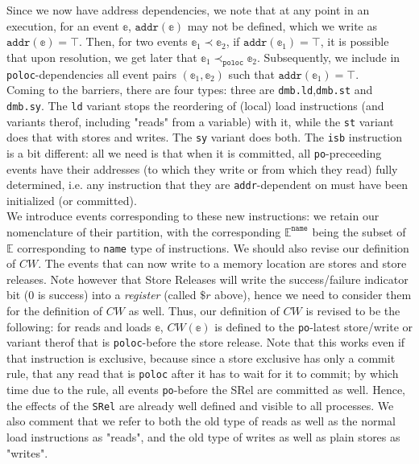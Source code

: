\documentclass{article}
\newcommand{\var}{\texttt}
\begin{document}
Since we now have address dependencies, we note that at any point in an execution, for an event $\mathbb{e}$, $\var{addr}(\mathbb{e})$ may not be defined, which we write as $\var{addr}(\mathbb{e}) = \top$. Then, for two events $\mathbb{e}_1 \prec \mathbb{e}_2$, if $\var{addr}(\mathbb{e}_1) = \top$, it is possible that upon resolution, we get later that $\mathbb{e}_1 \prec_\var{poloc} \mathbb{e}_2$. Subsequently, we include in \var{poloc}-dependencies all event pairs $(\mathbb{e}_1,\mathbb{e}_2)$ such that $\var{addr}(\mathbb{e}_1) = \top$.\\
Coming to the barriers, there are four types: three are \var{dmb.ld},\var{dmb.st} and \var{dmb.sy}. The \var{ld} variant stops the reordering of (local) load instructions (and variants therof, including "reads" from a variable) with it, while the \var{st} variant does that with stores and writes. The \var{sy} variant does both. The \var{isb} instruction is a bit different: all we need is that when it is committed, all \var{po}-preceeding events have their addresses (to which they write or from which they read) fully determined, i.e. any instruction that they are \var{addr}-dependent on must have been initialized (or committed).\\
We introduce events corresponding to these new instructions: we retain our nomenclature of their partition, with the corresponding $\mathbb{E}^\texttt{name}$ being the subset of $\mathbb{E}$ corresponding to \texttt{name} type of instructions. We should also revise our definition of $CW$. The events that can now write to a memory location are stores and store releases. Note however that Store Releases will write the success/failure indicator bit (0 is success) into a \textit{register} (called $\$r$ above), hence we need to consider them for the definition of $CW$ as well. Thus, our definition of $CW$ is revised to be the following: for reads and loads $\mathbb{e}$, $CW(\mathbb{e})$ is defined to the \var{po}-latest store/write or variant therof that is \var{poloc}-before the store release. Note that this works even if that instruction is exclusive, because since a store exclusive has only a commit rule, that any read that is \var{poloc} after it has to wait for it to commit; by which time due to the rule, all events \var{po}-before the SRel are committed as well. Hence, the effects of the \var{SRel} are already well defined and visible to all processes. We also comment that we refer to both the old type of reads as well as the normal load instructions as "reads", and the old type of writes as well as plain stores as "writes".\\
\end{document}
